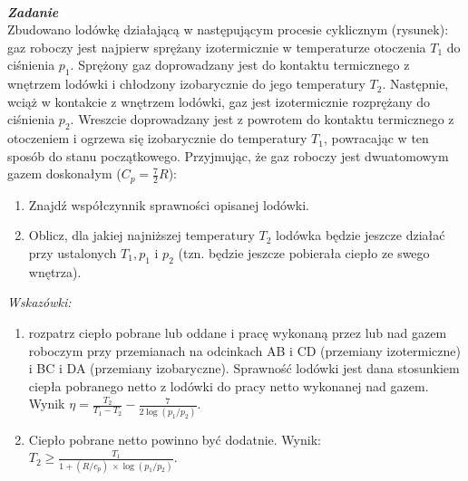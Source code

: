 \documentclass[11pt,a4paper]{article}
\newcounter{zadanie}\newcommand{\zadanie}[1][]{\addtocounter{zadanie}{1} ~\\  {\bf \emph{Zadanie \arabic{zadanie} #1 }} \\}
\begin{document}
\begin{figure}\vspace{0mm}
\end{figure}
\zadanie
Zbudowano lodówkę działającą w następującym procesie cyklicznym (rysunek): gaz roboczy jest najpierw sprężany izotermicznie w temperaturze otoczenia $T_1$ do ciśnienia $p_1$. Sprężony gaz doprowadzany jest do kontaktu termicznego z wnętrzem lodówki i chłodzony izobarycznie do jego temperatury $T_2$. Następnie, wciąż w kontakcie z wnętrzem lodówki, gaz jest izotermicznie rozprężany do ciśnienia $p_2$. Wreszcie doprowadzany jest z powrotem do kontaktu termicznego z otoczeniem i ogrzewa się izobarycznie do temperatury $T_1$, powracając w ten sposób do stanu początkowego.
Przyjmując, że gaz roboczy jest dwuatomowym gazem doskonałym ($C_p=\frac{7}{2}R$):
\begin{enumerate}
\item Znajdź współczynnik sprawności opisanej lodówki.
\item Oblicz, dla jakiej najniższej temperatury $T_2$ lodówka będzie jeszcze działać przy ustalonych $T_1, p_1$ i $p_2$ (tzn. będzie jeszcze pobierała ciepło ze swego wnętrza).
\end{enumerate}
{\em Wskazówki:}
 \begin{enumerate}
 \item  rozpatrz ciepło pobrane lub oddane i pracę wykonaną przez lub nad gazem roboczym przy przemianach na odcinkach AB i CD (przemiany izotermiczne) i BC i DA (przemiany izobaryczne). Sprawność lodówki jest dana stosunkiem ciepła pobranego netto z lodówki do pracy netto wykonanej nad gazem.  Wynik $\eta=\frac{T_2}{T_1-T_2}-\frac{7}{2\log(p_1/p_2)}$.\\
 \item Ciepło pobrane netto powinno być dodatnie.  Wynik: $T_2\geq \frac{T_1}{1+(R/c_p)\, \times \log(p_1/p_2)}$.
 \end{enumerate}
 
\end{document}
